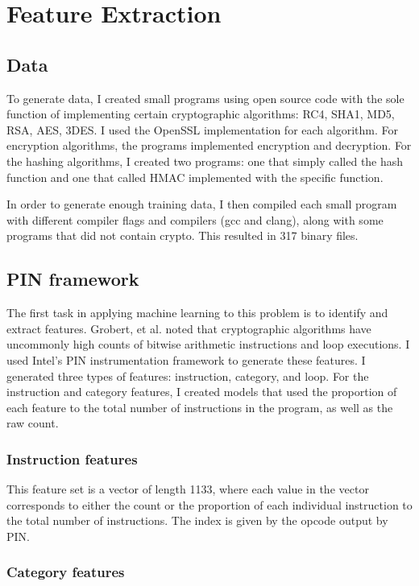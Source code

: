 \chapter{Feature Extraction}

\section{Data}
To generate data, I created small programs using open source code with the sole function of implementing certain cryptographic algorithms: RC4, SHA1, MD5, RSA, AES, 3DES.  I used the OpenSSL implementation for each algorithm.  For encryption algorithms, the programs implemented encryption and decryption.  For the hashing algorithms, I created two programs: one that simply called the hash function and one that called HMAC implemented with the specific function.

In order to generate enough training data, I then compiled each small program with different compiler flags and compilers (gcc and clang), along with some programs that did not contain crypto.  This resulted in 317 binary files.


\section{PIN framework}
The first task in applying machine learning to this problem is to identify and extract features.  Grobert, et al. \cite{grobert} noted that cryptographic algorithms have uncommonly high counts of bitwise arithmetic instructions and loop executions.  I used Intel's PIN instrumentation framework \cite{pin} to generate these features.  I generated three types of features: instruction, category, and loop.  For the instruction and category features, I created models that used the proportion of each feature to the total number of instructions in the program, as well as the raw count.

\subsection{Instruction features}
This feature set is a vector of length 1133, where each value in the vector corresponds to either the count or the proportion of each individual instruction to the total number of instructions.  The index is given by the opcode output by PIN.

\subsection{Category features}

